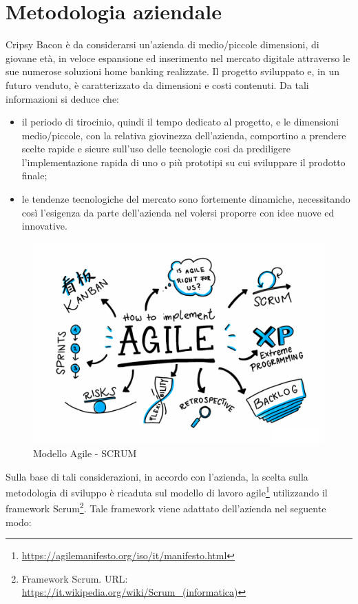 \section{Metodologia aziendale}
Cripsy Bacon è da considerarsi un'azienda di medio/piccole dimensioni, di giovane età, in veloce espansione ed inserimento nel mercato digitale attraverso le sue numerose soluzioni home banking realizzate. Il progetto sviluppato e, in un futuro venduto, è caratterizzato da dimensioni e costi contenuti. Da tali informazioni si deduce che: 
\begin{itemize}
    \item il periodo di tirocinio, quindi il tempo dedicato al progetto, e le dimensioni medio/piccole, con la relativa giovinezza dell'azienda, comportino a prendere scelte rapide e sicure sull'uso delle tecnologie cosi da prediligere l'implementazione rapida di uno o più prototipi su cui sviluppare il prodotto finale;
    \item le tendenze tecnologiche del mercato sono fortemente dinamiche, necessitando così l'esigenza da parte dell'azienda nel volersi proporre con idee nuove ed innovative.
\end{itemize}
\begin{figure}[H] 
    \centering 
    \includegraphics[width=1\columnwidth]{immagini/scrum.png}
    \caption{\label{fig:alexa_aws}Modello Agile - SCRUM}
\end{figure}
Sulla base di tali considerazioni, in accordo con l'azienda, la scelta sulla metodologia di sviluppo è ricaduta sul modello di lavoro agile\footnote{\href{Modello agile: URL: https://agilemanifesto.org/iso/it/manifesto.html}{https://agilemanifesto.org/iso/it/manifesto.html}} utilizzando il framework Scrum\footnote{Framework Scrum. URL: \href{https://it.wikipedia.org/wiki/Scrum\_(informatica)}{https://it.wikipedia.org/wiki/Scrum\_(informatica)}}. Tale framework viene adattato dell'azienda nel seguente modo:
